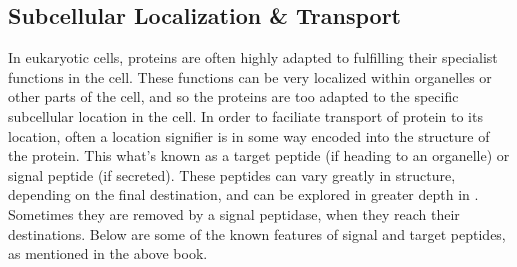 \documentclass{bioinfo}
\begin{document}
\subsection{Subcellular Localization \& Transport}

In eukaryotic cells, proteins are often highly adapted to fulfilling their specialist functions in the cell.
These functions can be very localized within organelles or other parts of the cell, and so the proteins are too adapted to the specific subcellular location in the cell. 
In order to faciliate transport of protein to its location, often a location signifier is in some way encoded into the structure of the protein.
This what's known as a target peptide (if heading to an organelle) or signal peptide (if secreted). 
These peptides can vary greatly in structure, depending on the final destination, and can be explored in greater depth in \cite{Alb00}. 
Sometimes they are removed by a signal peptidase, when they reach their destinations.
Below are some of the known features of signal and target peptides, as mentioned in the above book.
\end{document}
